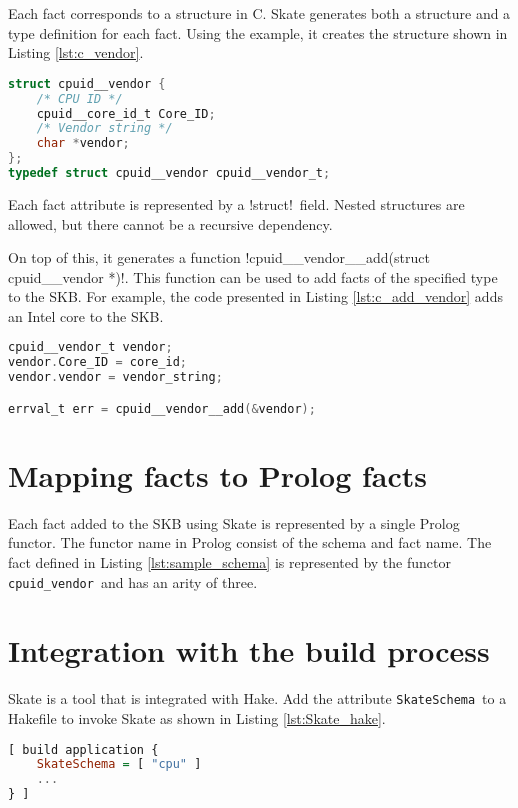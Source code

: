 \documentclass[a4paper,11pt,twoside]{report}
\begin{document}
{{Each fact corresponds to a structure in C. Skate generates both a structure
and a type definition for each fact. Using the example, it creates the
structure shown in Listing \ref{lst:c_vendor}.

\begin{lstlisting}[caption={C header for fact
\varname{vendor}},label={lst:c_vendor},language=C]
struct cpuid__vendor {
    /* CPU ID */
    cpuid__core_id_t Core_ID;
    /* Vendor string */
    char *vendor;
};
typedef struct cpuid__vendor cpuid__vendor_t;
\end{lstlisting}

Each fact attribute is represented by a \ccode!struct!~field. Nested structures are
allowed, but there cannot be a recursive dependency.

On top of this, it generates a function
\ccode!cpuid__vendor__add(struct cpuid__vendor *)!.
This function can be used to add facts of the specified type to the SKB. For
example, the code presented in Listing \ref{lst:c_add_vendor} adds an Intel core
to the SKB.

\begin{lstlisting}[caption={C example to add a vendor fact.},
label={lst:c_add_vendor}, language=C]
cpuid__vendor_t vendor;
vendor.Core_ID = core_id;
vendor.vendor = vendor_string;

errval_t err = cpuid__vendor__add(&vendor);
\end{lstlisting}

\section{Mapping facts to Prolog facts}

Each fact added to the SKB using Skate is represented by a single Prolog
functor.  The functor name in Prolog consist of the schema and fact name.  The
fact defined in Listing \ref{lst:sample_schema} is represented by the functor
\lstinline!cpuid_vendor!~and has an arity of three.

\section{Integration with the build process}

Skate is a tool that is integrated with Hake. Add the attribute
\lstinline!SkateSchema!~to a Hakefile to invoke Skate as shown in Listing
\ref{lst:Skate_hake}.

\begin{lstlisting}[caption={Including Skate schemata in Hake},
label={lst:Skate_hake}, language=Haskell]
[ build application {
    SkateSchema = [ "cpu" ]
    ... 
} ]
\end{lstlisting}

}}
\end{document}
